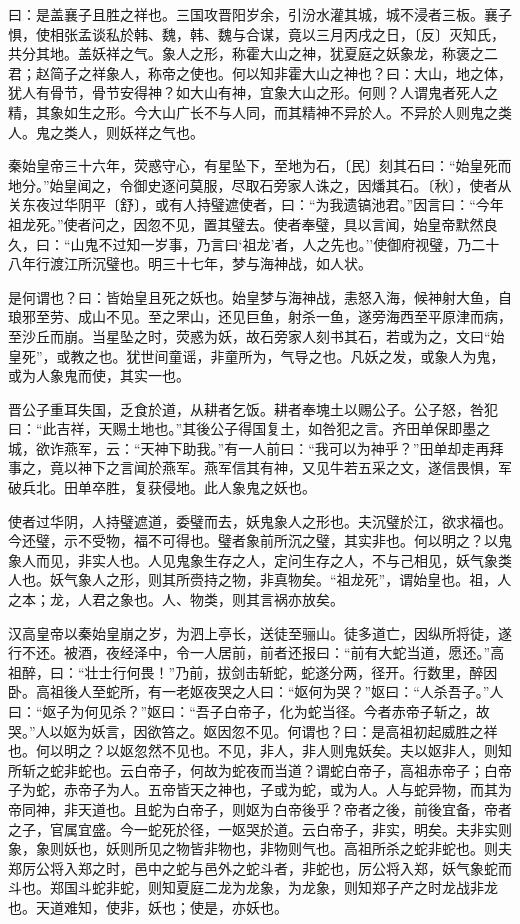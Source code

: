 \documentclass[]{article}
\begin{document}
曰：是盖襄子且胜之祥也。三国攻晋阳岁余，引汾水灌其城，城不浸者三板。襄子惧，使相张孟谈私於韩、魏，韩、魏与合谋，竟以三月丙戌之日，〔反〕灭知氏，共分其地。盖妖祥之气。象人之形，称霍大山之神，犹夏庭之妖象龙，称褒之二君；赵简子之祥象人，称帝之使也。何以知非霍大山之神也？曰：大山，地之体，犹人有骨节，骨节安得神？如大山有神，宜象大山之形。何则？人谓鬼者死人之精，其象如生之形。今大山广长不与人同，而其精神不异於人。不异於人则鬼之类人。鬼之类人，则妖祥之气也。

秦始皇帝三十六年，荧惑守心，有星坠下，至地为石，〔民〕刻其石曰：``始皇死而地分。''始皇闻之，令御史逐问莫服，尽取石旁家人诛之，因燔其石。〔秋〕，使者从关东夜过华阴平〔舒〕，或有人持璧遮使者，曰：``为我遗镐池君。''因言曰：``今年祖龙死。''使者问之，因忽不见，置其璧去。使者奉璧，具以言闻，始皇帝默然良久，曰：``山鬼不过知一岁事，乃言曰`祖龙'者，人之先也。''使御府视璧，乃二十八年行渡江所沉璧也。明三十七年，梦与海神战，如人状。

是何谓也？曰：皆始皇且死之妖也。始皇梦与海神战，恚怒入海，候神射大鱼，自琅邪至劳、成山不见。至之罘山，还见巨鱼，射杀一鱼，遂旁海西至平原津而病，至沙丘而崩。当星坠之时，荧惑为妖，故石旁家人刻书其石，若或为之，文曰``始皇死''，或教之也。犹世间童谣，非童所为，气导之也。凡妖之发，或象人为鬼，或为人象鬼而使，其实一也。

晋公子重耳失国，乏食於道，从耕者乞饭。耕者奉塊土以赐公子。公子怒，咎犯曰：``此吉祥，天赐土地也。''其後公子得国复土，如咎犯之言。齐田单保即墨之城，欲诈燕军，云：``天神下助我。''有一人前曰：``我可以为神乎？''田单却走再拜事之，竟以神下之言闻於燕军。燕军信其有神，又见牛若五采之文，遂信畏惧，军破兵北。田单卒胜，复获侵地。此人象鬼之妖也。

使者过华阴，人持璧遮道，委璧而去，妖鬼象人之形也。夫沉璧於江，欲求福也。今还璧，示不受物，福不可得也。璧者象前所沉之璧，其实非也。何以明之？以鬼象人而见，非实人也。人见鬼象生存之人，定问生存之人，不与己相见，妖气象类人也。妖气象人之形，则其所赍持之物，非真物矣。``祖龙死''，谓始皇也。祖，人之本；龙，人君之象也。人、物类，则其言祸亦放矣。

汉高皇帝以秦始皇崩之岁，为泗上亭长，送徒至骊山。徒多道亡，因纵所将徒，遂行不还。被酒，夜经泽中，令一人居前，前者还报曰：``前有大蛇当道，愿还。''高祖醉，曰：``壮士行何畏！''乃前，拔剑击斩蛇，蛇遂分两，径开。行数里，醉因卧。高祖後人至蛇所，有一老妪夜哭之人曰：``妪何为哭？''妪曰：``人杀吾子。''人曰：``妪子为何见杀？''妪曰：``吾子白帝子，化为蛇当径。今者赤帝子斩之，故哭。''人以妪为妖言，因欲笞之。妪因忽不见。何谓也？曰：是高祖初起威胜之祥也。何以明之？以妪忽然不见也。不见，非人，非人则鬼妖矣。夫以妪非人，则知所斩之蛇非蛇也。云白帝子，何故为蛇夜而当道？谓蛇白帝子，高祖赤帝子；白帝子为蛇，赤帝子为人。五帝皆天之神也，子或为蛇，或为人。人与蛇异物，而其为帝同神，非天道也。且蛇为白帝子，则妪为白帝後乎？帝者之後，前後宜备，帝者之子，官属宜盛。今一蛇死於径，一妪哭於道。云白帝子，非实，明矣。夫非实则象，象则妖也，妖则所见之物皆非物也，非物则气也。高祖所杀之蛇非蛇也。则夫郑厉公将入郑之时，邑中之蛇与邑外之蛇斗者，非蛇也，厉公将入郑，妖气象蛇而斗也。郑国斗蛇非蛇，则知夏庭二龙为龙象，为龙象，则知郑子产之时龙战非龙也。天道难知，使非，妖也；使是，亦妖也。
\end{document}
